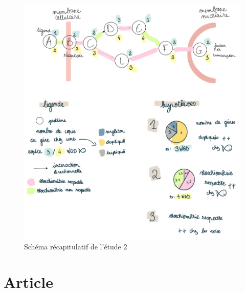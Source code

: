 \begin{figure}[H]
    \centering
    \includegraphics[width=1\textwidth]{figures/corps/figure15.png}
    \caption{Schéma récapitulatif de l'étude 2}
    \label{fig:15_schéma2}
\end{figure} 
\newpage

\section{Article}\label{art2}
\setlength{\headheight}{17.30428pt}
\addtolength{\topmargin}{-5.30428pt}
